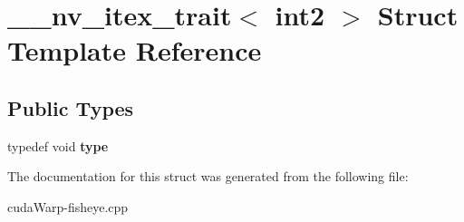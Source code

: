 \hypertarget{struct____nv__itex__trait_3_01int2_01_4}{}\section{\+\_\+\+\_\+nv\+\_\+itex\+\_\+trait$<$ int2 $>$ Struct Template Reference}
\label{struct____nv__itex__trait_3_01int2_01_4}
\subsection*{Public Types}
\begin{DoxyCompactItemize}
\item 
typedef void {\bfseries type}\hypertarget{struct____nv__itex__trait_3_01int2_01_4_afe70347a3ef8aaed1ca5bea2ded36f91}{}\label{struct____nv__itex__trait_3_01int2_01_4_afe70347a3ef8aaed1ca5bea2ded36f91}

\end{DoxyCompactItemize}


The documentation for this struct was generated from the following file\+:\begin{DoxyCompactItemize}
\item 
cuda\+Warp-\/fisheye.\+cpp\end{DoxyCompactItemize}
